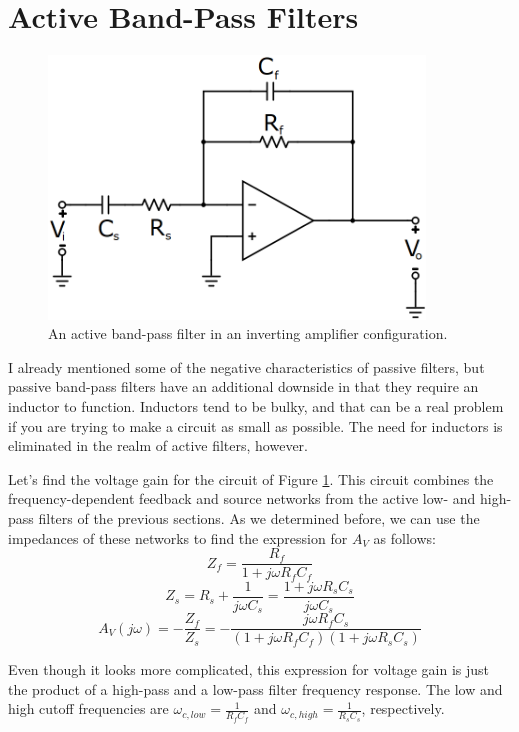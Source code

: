 \section{Active Band-Pass Filters}
\begin{figure}[h!]
\centering
\includegraphics[width=10cm]{figures/activeBP.png}
\caption{An active band-pass filter in an inverting amplifier configuration.}
\label{activeBP}
\end{figure}
I already mentioned some of the negative characteristics of passive filters, but passive band-pass filters have an additional downside in that they require an inductor to function. Inductors tend to be bulky, and that can be a real problem if you are trying to make a circuit as small as possible. The need for inductors is eliminated in the realm of active filters, however.
\par
Let's find the voltage gain for the circuit of Figure \ref{activeBP}. This circuit combines the frequency-dependent feedback and source networks from the active low- and high-pass filters of the previous sections. As we determined before, we can use the impedances of these networks to find the expression for $A_V$ as follows:
$$
Z_f = \frac{R_f}{1+ j\omega R_fC_f}
$$
$$
Z_s = R_s + \frac{1}{j\omega C_s} = \frac{1 + j\omega R_sC_s}{j\omega C_s}
$$
$$
A_V(j\omega) = -\frac{Z_f}{Z_s} = -\frac{j\omega R_fC_s}{(1+ j\omega R_fC_f)(1 + j\omega R_sC_s)}
$$
\par
Even though it looks more complicated, this expression for voltage gain is just the product of a high-pass and a low-pass filter frequency response. The low and high cutoff frequencies are $\omega_{c,low} = \frac{1}{R_fC_f}$ and $\omega_{c,high} = \frac{1}{R_sC_s}$, respectively.
